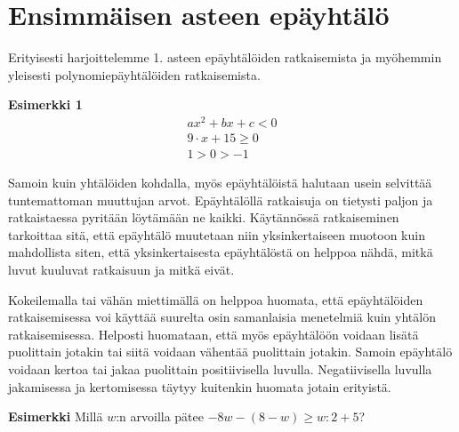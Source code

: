 %
%
%
%

\section{Ensimmäisen asteen epäyhtälö}

Erityisesti harjoittelemme 1. asteen epäyhtälöiden ratkaisemista ja myöhemmin yleisesti polynomiepäyhtälöiden ratkaisemista.

\textbf{Esimerkki 1}
\begin{align*}
ax^2+bx+c<0 \\
9 \cdot x+15\geq 0 \\
1>0>-1
\end{align*}

Samoin kuin yhtälöiden kohdalla, myös epäyhtälöistä halutaan usein selvittää
tuntemattoman muuttujan arvot. Epäyhtälöllä ratkaisuja on tietysti paljon ja ratkaistaessa
pyritään löytämään ne kaikki. Käytännössä ratkaiseminen tarkoittaa sitä, että epäyhtälö
muutetaan niin yksinkertaiseen muotoon kuin mahdollista siten, että yksinkertaisesta epäyhtälöstä
on helppoa nähdä, mitkä luvut kuuluvat ratkaisuun ja mitkä eivät.

Kokeilemalla tai vähän miettimällä on helppoa huomata, että epäyhtälöiden ratkaisemisessa
voi käyttää suurelta osin samanlaisia menetelmiä kuin yhtälön ratkaisemisessa. Helposti huomataan,
että myös epäyhtälöön voidaan lisätä puolittain jotakin tai siitä voidaan vähentää puolittain jotakin.
Samoin epäyhtälö voidaan kertoa tai jakaa puolittain positiivisella luvulla. Negatiivisella luvulla
jakamisessa ja kertomisessa täytyy kuitenkin huomata jotain erityistä.


\textbf{Esimerkki}
Millä $w$:n arvoilla pätee $-8w-(8-w)\geq w:2+5$?

